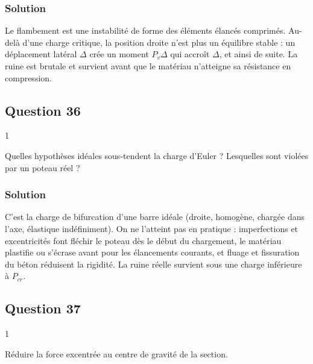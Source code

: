 \documentclass[11pt,a4paper]{article}
\begin{document}
\hypertarget{solution-34}{%
\subsubsection{Solution}\label{solution-34}}

Le flambement est une instabilité de forme des éléments élancés comprimés. Au-delà d'une charge critique, la position droite n'est plus un équilibre stable : un déplacement latéral \(\Delta\) crée un moment \(P_v\Delta\) qui accroît \(\Delta\), et ainsi de suite. La ruine est brutale et survient avant que le matériau n'atteigne sa résistance en compression.

\hypertarget{question-36}{%
\subsection{Question 36}\label{question-36}}

\begin{indication}{1}

Quelles hypothèses idéales sous-tendent la charge d'Euler ? Lesquelles sont violées par un poteau réel ?

\end{indication}

\hypertarget{solution-35}{%
\subsubsection{Solution}\label{solution-35}}

C'est la charge de bifurcation d'une barre idéale (droite, homogène, chargée dans l'axe, élastique indéfiniment). On ne l'atteint pas en pratique : imperfections et excentricités font fléchir le poteau dès le début du chargement, le matériau plastifie ou s'écrase avant pour les élancements courants, et fluage et fissuration du béton réduisent la rigidité. La ruine réelle survient sous une charge inférieure à \(P_{cr}\).

\hypertarget{question-37}{%
\subsection{Question 37}\label{question-37}}

\begin{indication}{1}

Réduire la force excentrée au centre de gravité de la section.

\end{indication}
\end{document}
